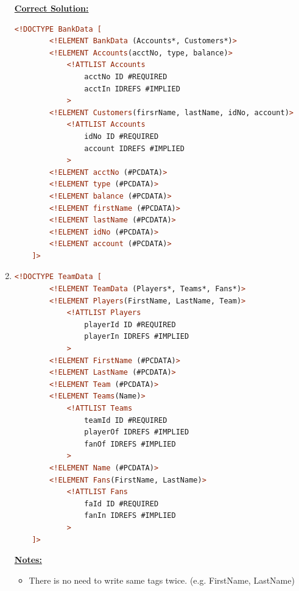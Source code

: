 \documentclass[12pt]{article}
\begin{document}
\begin{enumerate}[1.]
    \bigskip

    \begin{mdframed}

    \underline{\textbf{Correct Solution:}}

    \bigskip

    \begin{lstlisting}[language=XML]
    <!DOCTYPE BankData [
        <!ELEMENT BankData (Accounts*, Customers*)>
        <!ELEMENT Accounts(acctNo, type, balance)>
            <!ATTLIST Accounts
                acctNo ID #REQUIRED
                acctIn IDREFS #IMPLIED
            >
        <!ELEMENT Customers(firsrName, lastName, idNo, account)>
            <!ATTLIST Accounts
                idNo ID #REQUIRED
                account IDREFS #IMPLIED
            >
        <!ELEMENT acctNo (#PCDATA)>
        <!ELEMENT type (#PCDATA)>
        <!ELEMENT balance (#PCDATA)>
        <!ELEMENT firstName (#PCDATA)>
        <!ELEMENT lastName (#PCDATA)>
        <!ELEMENT idNo (#PCDATA)>
        <!ELEMENT account (#PCDATA)>
    ]>
    \end{lstlisting}

    \end{mdframed}

    \item

    \begin{lstlisting}[language=XML]
    <!DOCTYPE TeamData [
        <!ELEMENT TeamData (Players*, Teams*, Fans*)>
        <!ELEMENT Players(FirstName, LastName, Team)>
            <!ATTLIST Players
                playerId ID #REQUIRED
                playerIn IDREFS #IMPLIED
            >
        <!ELEMENT FirstName (#PCDATA)>
        <!ELEMENT LastName (#PCDATA)>
        <!ELEMENT Team (#PCDATA)>
        <!ELEMENT Teams(Name)>
            <!ATTLIST Teams
                teamId ID #REQUIRED
                playerOf IDREFS #IMPLIED
                fanOf IDREFS #IMPLIED
            >
        <!ELEMENT Name (#PCDATA)>
        <!ELEMENT Fans(FirstName, LastName)>
            <!ATTLIST Fans
                faId ID #REQUIRED
                fanIn IDREFS #IMPLIED
            >
    ]>
    \end{lstlisting}

    \bigskip

    \underline{\textbf{Notes:}}

    \begin{itemize}
        \item There is no need to write same tags twice. (e.g. FirstName, LastName)
    \end{itemize}


\end{enumerate}
\end{document}
